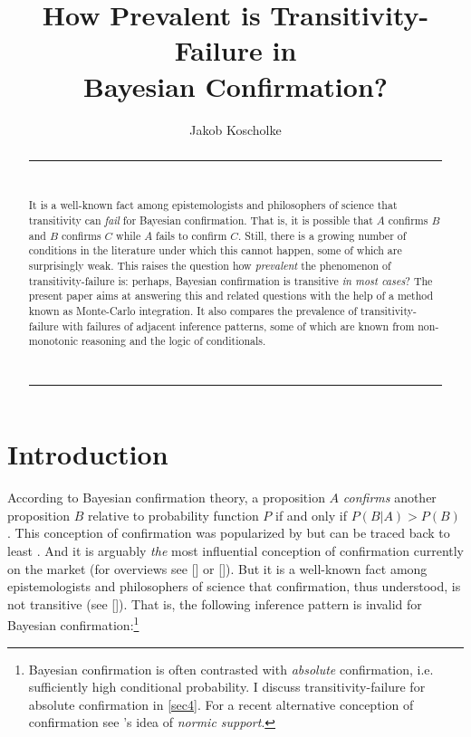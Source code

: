 \documentclass[a4paper,11pt]{article}
\author{Jakob Koscholke}
\title{How Prevalent is Transitivity-Failure in\\Bayesian Confirmation?}
\date{}
\begin{document}
\renewcommand{\abstractname}{\vspace{-\baselineskip}}

\maketitle

\begin{abstract}
\hrule\

\noindent It is a well-known fact among epistemologists and philosophers of science that transitivity can \emph{fail} for Bayesian confirmation. That is, it is possible that $A$ confirms $B$ and $B$ confirms $C$ while $A$ fails to confirm $C$. Still, there is a growing number of conditions in the literature under which this cannot happen, some of which are surprisingly weak. This raises the question how \emph{prevalent} the phenomenon of transitivity-failure is: perhaps, Bayesian confirmation is transitive \emph{in most cases}? The present paper aims at answering this and related questions with the help of a method known as Monte-Carlo integration. It also compares the prevalence of transitivity-failure with failures of adjacent inference patterns, some of which are known from non-monotonic reasoning and the logic of conditionals.

\ \hrule

\end{abstract}



\section{Introduction}

According to Bayesian confirmation theory, a proposition $A$ \emph{confirms} another proposition $B$ relative to probability function $P$ if and only if $P(B|A)>P(B)$. This conception of confirmation was popularized by \cite{Carnap1950} but can be traced back to least \cite{Keynes1921}. And it is arguably \emph{the} most influential conception of confirmation currently on the market (for overviews see \citeauthor{Fitelson2001diss} [\citeyear{Fitelson2001diss}] or \citeauthor{Strevens2017} [\citeyear{Strevens2017}]). But it is a well-known fact among epistemologists and philosophers of science that confirmation, thus understood, is not transitive (see \citeauthor{Suppes1970} [\citeyear{Suppes1970}]). That is, the following inference pattern is invalid for Bayesian confirmation:\footnote{Bayesian confirmation is often contrasted with \emph{absolute} confirmation, i.e. sufficiently high conditional probability. I discuss transitivity-failure for absolute confirmation in \autoref{sec4}. For a recent alternative conception of confirmation see \citeauthor{Smith2016}'s \citeyearpar{Smith2016} idea of \emph{normic support}.} 
\end{document}
